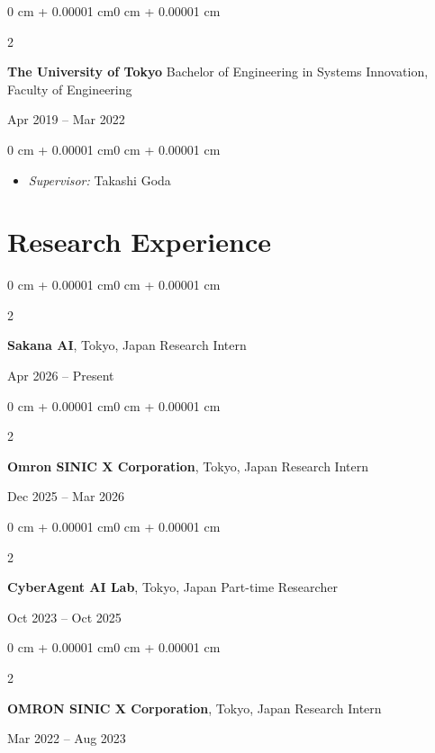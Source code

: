 \documentclass[10pt, letterpaper]{article}
\newenvironment{highlights}{
    \begin{itemize}[
        topsep=0.10 cm,
        parsep=0.10 cm,
        partopsep=0pt,
        itemsep=0pt,
        leftmargin=0 cm + 10pt
    ]
}{
    \end{itemize}
}
\newenvironment{onecolentry}{
    \begin{adjustwidth}{0 cm + 0.00001 cm}{0 cm + 0.00001 cm}
}{
    \end{adjustwidth}
}
\newenvironment{twocolentry}[2][]{
    \onecolentry
    \def\secondColumn{#2}
    \setcolumnwidth{\fill, 4.5 cm}
    \begin{paracol}{2}
}{
    \switchcolumn \raggedleft \secondColumn
    \end{paracol}
    \endonecolentry
}
\begin{document}
    \vspace{0.3 cm}
    
    \begin{twocolentry}{Apr 2019 -- Mar 2022}
        \textbf{The University of Tokyo} \newline
        Bachelor of Engineering in Systems Innovation, Faculty of Engineering
    \end{twocolentry}
    
    \vspace{0.10 cm}
    \begin{onecolentry}
        \begin{highlights}
            \item \textit{Supervisor:} Takashi Goda
        \end{highlights}
    \end{onecolentry}

    \section{Research Experience}
    
    \begin{twocolentry}{Apr 2026 -- Present}
        \textbf{Sakana AI}, Tokyo, Japan \newline
        Research Intern
    \end{twocolentry}
    
    \vspace{0.2 cm}
    
    \begin{twocolentry}{Dec 2025 -- Mar 2026}
        \textbf{Omron SINIC X Corporation}, Tokyo, Japan \newline
        Research Intern
    \end{twocolentry}
    
    \vspace{0.2 cm}
    
    \begin{twocolentry}{Oct 2023 -- Oct 2025}
        \textbf{CyberAgent AI Lab}, Tokyo, Japan \newline
        Part-time Researcher
    \end{twocolentry}
    
    \vspace{0.2 cm}
    
    \begin{twocolentry}{Mar 2022 -- Aug 2023}
        \textbf{OMRON SINIC X Corporation}, Tokyo, Japan \newline
        Research Intern
    \end{twocolentry}
    
\end{document}
